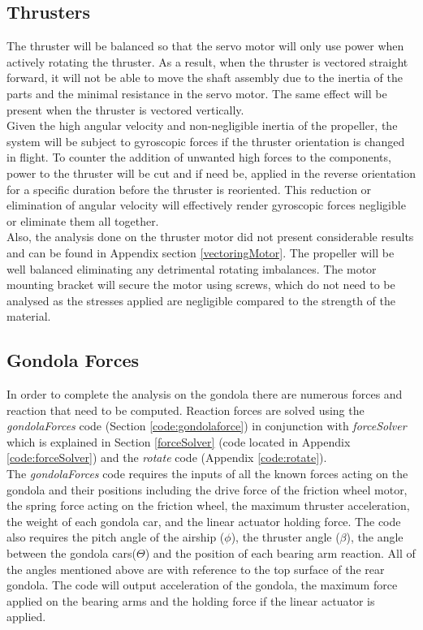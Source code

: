 \documentclass[../main.tex]{subfiles}
\begin{document}
\subsection{Thrusters} \label{thrusterIntro}
The thruster will be balanced so that the servo motor will only use power when actively rotating the thruster. As a result, when the thruster is vectored straight forward, it will not be able to move the shaft assembly due to the inertia of the parts and the minimal resistance in the servo motor. The same effect will be present when the thruster is vectored vertically.\\

Given the high angular velocity and non-negligible inertia of the propeller, the system will be subject to gyroscopic forces if the thruster orientation is changed in flight. To counter the addition of unwanted high forces to the components, power to the thruster will be cut and if need be, applied in the reverse orientation for a specific duration before the thruster is reoriented. This reduction or elimination of angular velocity will effectively render gyroscopic forces negligible or eliminate them all together. \\

Also, the analysis done on the thruster motor did not present considerable results and can be found in Appendix section \ref{vectoringMotor}. The propeller will be well balanced eliminating any detrimental rotating imbalances. The motor mounting bracket will secure the motor using screws, which do not need to be analysed as the stresses applied are negligible compared to the strength of the material.

\subsection{Gondola Forces} \label{gondForces}
In order to complete the analysis on the gondola there are numerous forces and reaction that need to be computed. Reaction forces are solved using the \textit{gondolaForces} code (Section \ref{code:gondolaforce}) in conjunction with \textit{forceSolver} which is explained in Section \ref{forceSolver} (code located in Appendix \ref{code:forceSolver}) and  the \textit{rotate} code (Appendix \ref{code:rotate}).\\

The \textit{gondolaForces} code requires the inputs of all the known forces acting on the gondola and their positions including the drive force of the friction wheel motor, the spring force acting on the friction wheel, the maximum thruster acceleration, the weight of each gondola car, and the linear actuator holding force. The code also requires the pitch angle of the airship ($\phi$), the thruster angle ($\beta$), the angle between the gondola cars($\Theta$) and the position of each bearing arm reaction. All of the angles mentioned above are with reference to the top surface of the rear gondola. The code will output acceleration of the gondola, the maximum force applied on the bearing arms and the holding force if the linear actuator is applied. \\
\end{document}
